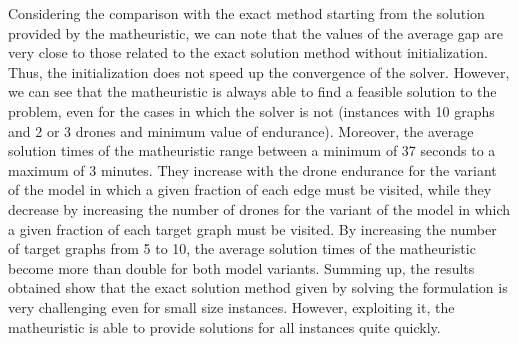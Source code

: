 \documentclass[10pt,a4paper]{elsarticle}
\newcommand{\EN}[1]{{\color{black}#1}}
\begin{document}
			Considering the comparison with the exact method starting from the solution provided by the matheuristic, we can note that the values of the average gap are very close to \EN{those} related to the exact solution method without initialization. Thus, the initialization does not speed up the convergence of the solver. However, we can see that the matheuristic is always able to find a feasible solution \EN{to} the problem, even for the cases in which the solver is not (instances with 10 graphs and 2 or 3 drones and minimum value of endurance). 
			\noindent
			Moreover, the average solution times of the matheuristic range between a minimum of 37 seconds to a maximum of 3 minutes. They increase with the drone endurance for the variant of the model in which a given fraction of each edge must be visited, while they decrease by increasing the number of drones for the variant of the model in which a given fraction of each target graph must be visited. By increasing the number of target graphs from 5 to 10, the average solution times of the matheuristic become more than double for both model variants.
			Summing up, the results obtained show that the exact solution method given by solving the formulation is very challenging even for small size instances. However, exploiting it, the matheuristic is able to provide  solutions for all instances \EN{quite} quickly.
			
\end{document}
